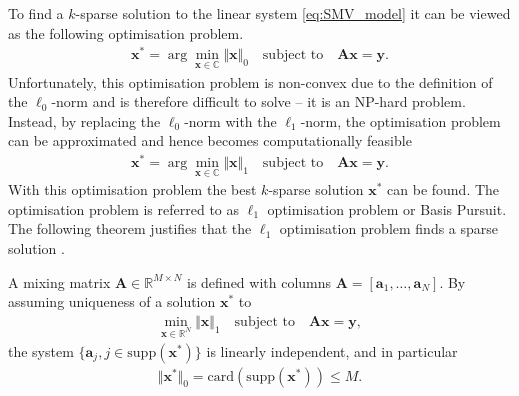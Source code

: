 To find a $k$-sparse solution to the linear system \eqref{eq:SMV_model} it can be viewed as the following optimisation problem. 
\begin{align*}\label{eq:SMV_p0}
\mathbf{x}^\ast = \arg \min_{\mathbf{x} \in \mathbb{C}} \Vert \mathbf{x} \Vert_0 \quad \text{subject to} \quad \mathbf{Ax} = \mathbf{y}.
\end{align*}
Unfortunately, this optimisation problem is non-convex due to the definition of the $\ell_0$-norm and is therefore difficult to solve -- it is an NP-hard problem. 
Instead, by replacing the $\ell_0$-norm with the $\ell_1$-norm, the optimisation problem can be approximated and hence becomes computationally feasible  \cite[p. 27]{CS}
\begin{align}\label{eq:SMV_p1}
\mathbf{x}^\ast = \arg \min_{\mathbf{x} \in \mathbb{C}} \Vert \mathbf{x} \Vert_1 \quad \text{subject to} \quad \mathbf{Ax} = \mathbf{y}.
\end{align} 
With this optimisation problem the best $k$-sparse solution $\mathbf{x}^\ast$ can be found. 
The optimisation problem is referred to as $\ell_1$ optimisation problem or Basis Pursuit. 
The following theorem justifies that the $\ell_1$ optimisation problem finds a sparse solution \cite[p. 62-63]{FR}.
\begin{theorem}\label{th:CS_A}
A mixing matrix $\mathbf{A} \in \mathbb{R}^{M \times N}$ is defined with columns $\mathbf{A} = [\mathbf{a}_1, \dots, \mathbf{a}_N]$. 
By assuming uniqueness of a solution $\mathbf{x}^{\ast}$ to
\begin{align*}
\min_{\mathbf{x} \in \mathbb{R}^N} \Vert \mathbf{x} \Vert_1 \quad \text{subject to} \quad \mathbf{Ax} = \mathbf{y},
\end{align*}
the system $\lbrace \mathbf{a}_j, j \in \text{supp}( \mathbf{x}^\ast) \rbrace$ is linearly independent, and in particular
\begin{align*}
\Vert \mathbf{x}^\ast \Vert_0 = \text{card}(\text{supp} (\mathbf{x}^\ast)) \leq M.
\end{align*}
\end{theorem}
